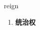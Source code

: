 
\begin{frame}
{\huge reign}
\begin{center}
\begin{enumerate}\Large
  \item \textbf{统治权}
\end{enumerate}
\end{center}
\end{frame}
